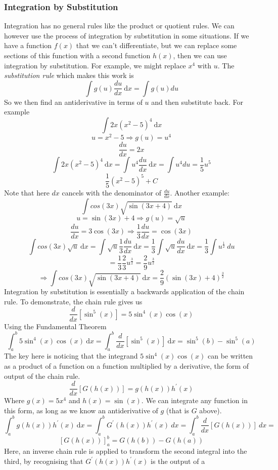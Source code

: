 \documentclass[12pt]{report}
\newcommand{\dx}{\:\mathrm{d}x}
\begin{document}
\begin{flushleft}
\subsubsection*{Integration by Substitution}
Integration has no general rules like the product or quotient rules.
We can however use the process of integration by substitution in some 
situations. If we have a function \(f(x)\) that we can't differentiate, but we
can replace some sections of this function with a second function \(h(x)\), 
then we can use integration by substitution. For example, we might replace 
\(x^4\) with  \(u\). The \textit{substitution rule} which makes this work is
\[\int g(u)\frac{du}{dx} \dx = \int g(u) du\]
So we then find an antiderivative in terms of \(u\) and then substitute back.
For example
\[\int 2x(x^2 - 5)^4 \dx\]
\[u = x^2 - 5 \Rightarrow g(u) = u^4\]
\[\frac{du}{dx} = 2x\]
\[\int 2x(x^2 - 5)^4 \dx = \int u^4\frac{du}{dx} \dx = \int u^4 du  
= \frac{1}{5}u^5\]
\[\frac{1}{5}(x^2 - 5)^5 + C\]
Note that here \(dx\) cancels with the denominator of \(\frac{du}{dx}\). 
Another example:
\[\int cos(3x) \sqrt{\sin(3x + 4)} \dx\]
\[u = \sin(3x) + 4 \Rightarrow g(u) = \sqrt{u}\]
\[\frac{du}{dx} = 3\cos(3x) \Rightarrow \frac{1}{3}\frac{du}{dx} = \cos(3x)\]
\[\int cos(3x) \sqrt{u} \dx = \int \sqrt{u}\frac{1}{3}\frac{du}{dx} \dx
= \frac{1}{3}\int \sqrt{u}\frac{du}{dx} \dx = \frac{1}{3}\int u^\frac{1}{2} 
\:du\]
\[= \frac{1}{3}\frac{2}{3}u^\frac{3}{2} = \frac{2}{9}u^\frac{3}{2}\]
\[\Rightarrow \int cos(3x) \sqrt{\sin(3x + 4)} \dx = 
\frac{2}{9}(\sin(3x) + 4)^\frac{3}{2}\]
Integration by substitution is essentially a backwards application of the chain
rule. To demonstrate, the chain rule gives us
\[\frac{d}{dx}\left[\sin^5(x)\right] = 5\sin^4(x)\cos(x)\]
Using the Fundamental Theorem
\[\int_a^b 5\sin^4(x)\cos(x) \dx = \int_a^b \frac{d}{dx}\left[\sin^5(x)\right]
\dx = \sin^5(b) - \sin^5(a)\]
The key here is noticing that the integrand \(5\sin^4(x)\cos(x)\) can be 
written as a product of a function on a function multiplied by a derivative,
the form of output of the chain rule.
\[\frac{d}{dx}\left[G(h(x))\right] = g(h(x))h^\prime(x)\]
Where \(g(x) = 5x^4\) and \(h(x) = \sin(x)\). We can integrate any function in
this form, as long as we know an antiderivative of \(g\) (that is \(G\) above).
\[\int_a^b g(h(x))h^\prime(x) \dx = \int_a^b G^\prime(h(x))h^\prime(x) \: dx
= \int_a^b \frac{d}{dx}\left[G(h(x))\right] \: dx = \]
\[\left[G(h(x))\right]_a^b = G(h(b)) - G(h(a))\]
Here, an inverse chain rule is applied to transform the second integral into
the third, by recognising that \(G^\prime(h(x))h^\prime(x)\) is the output of a

\end{flushleft}
\end{document}
